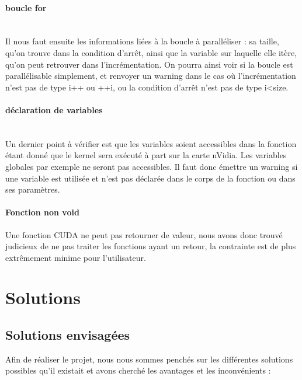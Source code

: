 \documentclass{article}
\begin{document}
	\paragraph{boucle for}
	~~\\
	\indent
	Il nous faut ensuite les informations liées à la boucle à paralléliser : sa taille, qu'on trouve dans la condition d'arrêt, ainsi que la variable sur laquelle elle itère, qu'on peut retrouver dans l'incrémentation. On pourra ainsi voir si la boucle est parallélisable simplement, et renvoyer un warning dans le cas où l'incrémentation n'est pas de type i++ ou ++i, ou la condition d'arrêt n'est pas de type i\textless size.	
	
	\paragraph{déclaration de variables}
	~~\\
	\indent
	Un dernier point à vérifier est que les variables soient accessibles dans la fonction étant donné que le kernel sera exécuté à part sur la carte nVidia. Les variables globales par exemple ne seront pas accessibles. Il faut donc émettre un warning si une variable est utilisée et n'est pas déclarée dans le corps de la fonction ou dans ses paramètres.
	
	\paragraph{Fonction non void}
	Une fonction CUDA ne peut pas retourner de valeur, nous avons donc trouvé judicieux de ne pas traiter les fonctions ayant un retour, la contrainte est de plus extrêmement minime pour l'utilisateur.
	
	\newpage	
	
	\section{Solutions}
	

	\subsection{Solutions envisagées}
	



	Afin de réaliser le projet, nous nous sommes penchés sur les différentes solutions possibles qu'il existait et avons cherché les avantages et les inconvénients :
	
\end{document}
